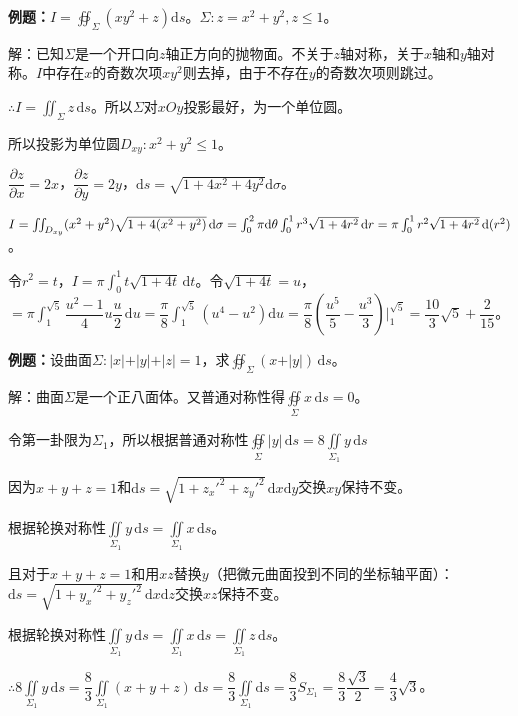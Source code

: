 \documentclass[UTF8, 12pt]{ctexart}
\begin{document}
        \textbf{例题：}$I=\oiint_\Sigma(xy^2+z)\textrm{d}s$。$\Sigma:z=x^2+y^2,z\leqslant1$。

        解：已知$\Sigma$是一个开口向$z$轴正方向的抛物面。不关于$z$轴对称，关于$x$轴和$y$轴对称。$I$中存在$x$的奇数次项$xy^2$则去掉，由于不存在$y$的奇数次项则跳过。

        $\therefore I=\iint_\Sigma z\,\textrm{d}s$。所以$\Sigma$对$xOy$投影最好，为一个单位圆。

        所以投影为单位圆$D_{xy}:x^2+y^2\leqslant1$。

        $\dfrac{\partial z}{\partial x}=2x$，$\dfrac{\partial z}{\partial y}=2y$，$\textrm{d}s=\sqrt{1+4x^2+4y^2}\textrm{d}\sigma$。

        $I=\iint_{D_{xy}}(x^2+y^2)\sqrt{1+4(x^2+y^2)}\,\textrm{d}\sigma=\int_0^2\pi\textrm{d}\theta\int_0^1r^3\sqrt{1+4r^2}\,\textrm{d}r=\\\pi\int_0^1r^2\sqrt{1+4r^2}\,\textrm{d}(r^2)$。

        令$r^2=t$，$I=\pi\int_0^1t\sqrt{1+4t}\,\textrm{d}t$。令$\sqrt{1+4t}=u$，$=\pi\int_1^{\sqrt{5}}\dfrac{u^2-1}{4}u\dfrac{u}{2}\,\textrm{d}u=\dfrac{\pi}{8}\int_1^{\sqrt{5}}(u^4-u^2)\textrm{d}u=\dfrac{\pi}{8}(\dfrac{u^5}{5}-\dfrac{u^3}{3})\bigg\vert_1^{\sqrt{5}}=\dfrac{10}{3}\sqrt{5}+\dfrac{2}{15}$。

        \textbf{例题：}设曲面$\Sigma:\vert x\vert+\vert y\vert+\vert z\vert=1$，求$\oiint_\Sigma(x+\vert y\vert)\,\textrm{d}s$。

        解：曲面$\Sigma$是一个正八面体。又普通对称性得$\oiint\limits_\Sigma x\,\textrm{d}s=0$。

        令第一卦限为$\Sigma_1$，所以根据普通对称性$\oiint\limits_\Sigma\vert y\vert\,\textrm{d}s=8\iint\limits_{\Sigma_1}y\,\textrm{d}s$

        因为$x+y+z=1$和$\textrm{d}s=\sqrt{1+z_x'^2+z_y'^2}\,\textrm{d}x\textrm{d}y$交换$xy$保持不变。

        根据轮换对称性$\iint\limits_{\Sigma_1}y\,\textrm{d}s=\iint\limits_{\Sigma_1}x\,\textrm{d}s$。

        且对于$x+y+z=1$和用$xz$替换$y$（把微元曲面投到不同的坐标轴平面）：$\textrm{d}s=\sqrt{1+y_x'^2+y_z'^2}\,\textrm{d}x\textrm{d}z$交换$xz$保持不变。

        根据轮换对称性$\iint\limits_{\Sigma_1}y\,\textrm{d}s=\iint\limits_{\Sigma_1}x\,\textrm{d}s=\iint\limits_{\Sigma_1}z\,\textrm{d}s$。

        $\therefore8\iint\limits_{\Sigma_1}y\,\textrm{d}s=\dfrac{8}{3}\iint\limits_{\Sigma_1}(x+y+z)\,\textrm{d}s=\dfrac{8}{3}\iint\limits_{\Sigma_1}\textrm{d}s=\dfrac{8}{3}S_{\Sigma_1}=\dfrac{8}{3}\dfrac{\sqrt{3}}{2}=\dfrac{4}{3}\sqrt{3}$。
\end{document}
